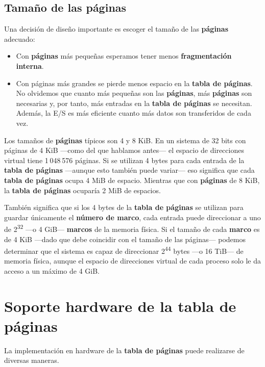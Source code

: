 \subsection{Tamaño de las páginas}\label{_tamauxf1o_de_las_puxe1ginas}

Una decisión de diseño importante es escoger el tamaño de las
\textbf{páginas} adecuado:

\begin{itemize}
\item
  Con \textbf{páginas} más pequeñas esperamos tener menos
  \textbf{fragmentación interna}.
\item
  Con páginas más grandes se pierde menos espacio en la \textbf{tabla de
  páginas}. No olvidemos que cuanto más pequeñas son las
  \textbf{páginas}, más \textbf{páginas} son necesarias y, por tanto,
  más entradas en la \textbf{tabla de páginas} se necesitan. Además, la
  E/S es más eficiente cuanto más datos son transferidos de cada vez.
\end{itemize}

Los tamaños de \textbf{páginas} típicos son 4 y 8 KiB. En un sistema de
32 bits con páginas de 4 KiB ---como del que hablamos antes--- el
espacio de direcciones virtual tiene 1 048 576 páginas. Si se utilizan 4
bytes para cada entrada de la \textbf{tabla de páginas} ---aunque esto
también puede variar--- eso significa que cada \textbf{tabla de páginas}
ocupa 4 MiB de espacio. Mientras que con \textbf{páginas} de 8 KiB, la
\textbf{tabla de páginas} ocuparía 2 MiB de espacios.

También significa que si los 4 bytes de la \textbf{tabla de páginas} se
utilizan para guardar únicamente el \textbf{número de marco}, cada
entrada puede direccionar a uno de 2\textsuperscript{32} ---o 4 GiB---
\textbf{marcos} de la memoria física. Si el tamaño de cada
\textbf{marco} es de 4 KiB ---dado que debe coincidir con el tamaño de
las páginas--- podemos determinar que el sistema es capaz de direccionar
2\textsuperscript{44} bytes ---o 16 TiB--- de memoria física, aunque el
espacio de direcciones virtual de cada proceso solo le da acceso a un
máximo de 4 GiB.

\section{Soporte hardware de la tabla de
páginas}\label{_soporte_hardware_de_la_tabla_de_puxe1ginas}

La implementación en hardware de la \textbf{tabla de páginas} puede
realizarse de diversas maneras.


